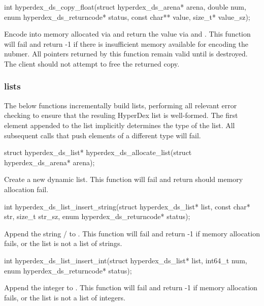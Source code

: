 \funcsep
\begin{ccode}
int hyperdex_ds_copy_float(struct hyperdex_ds_arena* arena, double num,
                           enum hyperdex_ds_returncode* status,
                           const char** value, size_t* value_sz);
\end{ccode}
\funcdesc Encode  into memory allocated via  and return
the value via  and .  This function will fail and
return -1 if there is insufficient memory available for encoding the nubmer.
All pointers returned by this function remain valid until  is
destroyed.  The client should not attempt to free the returned copy.

\subsubsection{lists}

The below functions incrementally build lists, performing all relevant error
checking to ensure that the resuling HyperDex list is well-formed.  The first
element appended to the list implicitly determines the type of the list.  All
subsequent calls that push elements of a different type will fail.

\begin{ccode}
struct hyperdex_ds_list* hyperdex_ds_allocate_list(struct hyperdex_ds_arena* arena);
\end{ccode}
\funcdesc Create a new dynamic list.  This function will fail and return
 should memory allocation fail.

\funcsep
\begin{ccode}
int hyperdex_ds_list_insert_string(struct hyperdex_ds_list* list,
                                   const char* str, size_t str_sz,
                                   enum hyperdex_ds_returncode* status);
\end{ccode}
\funcdesc Append the string / to .  This
function will fail and return -1 if memory allocation fails, or the list is not
a list of strings.

\funcsep
\begin{ccode}
int hyperdex_ds_list_insert_int(struct hyperdex_ds_list* list, int64_t num,
                                enum hyperdex_ds_returncode* status);
\end{ccode}
\funcdesc Append the integer  to .  This function will fail
and return -1 if memory allocation fails, or the list is not a list of integers.

